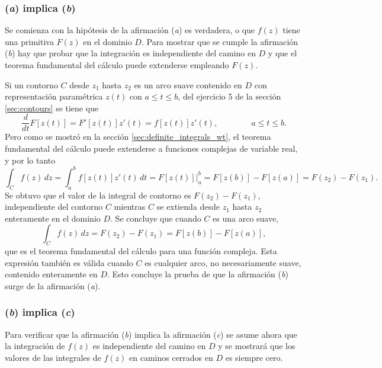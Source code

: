 \documentclass[a4paper]{report}
\begin{document}
\subsubsection*{(\textit{a}) implica (\textit{b})}

Se comienza con la hipótesis de la afirmación (\textit{a}) es verdadera, o que \(f(z)\) tiene una primitiva \(F(z)\) en el dominio \(D\). Para mostrar que se cumple la afirmación (\textit{b}) hay que probar que la integración es independiente del camino en \(D\) y que el teorema fundamental del cálculo puede extenderse empleando \(F(z)\). 

Si un contorno \(C\) desde \(z_1\) hasta \(z_2\) es un arco suave contenido en \(D\) con representación paramétrica \(z(t)\) con \(a\leq t\leq b\), del ejercicio 5 de la sección \ref{sec:contours} se tiene que 
\[
 \frac{d}{dt}F[z(t)]=F'[z(t)]z'(t)=f[z(t)]z'(t),
 \qquad\qquad
 a\leq t\leq b.
\]
Pero como se mostró en la sección \ref{sec:definite_integrals_wt}, el teorema fundamental del cálculo puede extenderse a funciones complejas de variable real, y por lo tanto
\[
 \int_Cf(z)\,dz=\int_a^bf[z(t)]z'(t)\,dt=F[z(t)]\bigg|_a^b=F[z(b)]-F[z(a)]=F(z_2)-F(z_1).
\]
Se obtuvo que el valor de la integral de contorno es \(F(z_2)-F(z_1)\), independiente del contorno \(C\) mientras \(C\) se extienda desde \(z_1\) hasta \(z_2\) enteramente en el dominio \(D\). Se concluye que cuando \(C\) es una arco suave,
\[
 \int_Cf(z)\,dz=F(z_2)-F(z_1)=F[z(b)]-F[z(a)],
\]
que es el teorema fundamental del cálculo para una función compleja. Esta expresión también es válida cuando \(C\) es cualquier arco, no necesariamente suave, contenido enteramente en \(D\). Esto concluye la prueba de que la afirmación (\textit{b}) surge de la afirmación (\textit{a}). 

\subsubsection*{(\textit{b}) implica (\textit{c})}

Para verificar que la afirmación (\textit{b}) implica la afirmación (\textit{c}) se asume ahora que la integración de \(f(z)\) es independiente del camino en \(D\) y se mostrará que los valores de las integrales de \(f(z)\) en caminos cerrados en \(D\) es siempre cero.
\end{document}
